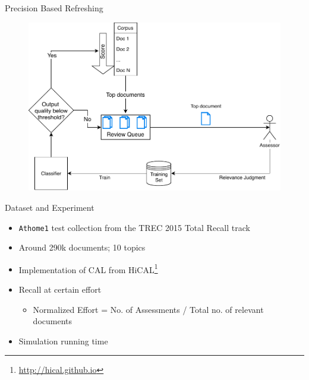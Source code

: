 \documentclass[14pt]{beamer}
\begin{document}
\begin{frame}{Precision Based Refreshing}
\begin{figure}
 \centering 
 \includegraphics[width=1.0\textwidth]{animation/prec.pdf}
\end{figure}
\end{frame}

\begin{frame}{Dataset and Experiment}
    \begin{itemize}
        \item \texttt{Athome1} test collection from the TREC 2015 Total Recall track
        \item Around 290k documents; 10 topics
        \item Implementation of CAL from
            HiCAL\footnote{\url{http://hical.github.io}}
        \item Recall at certain effort
            \begin{itemize}
                \item Normalized Effort = No. of Assessments / Total no. of
                    relevant documents
            \end{itemize}
        \item Simulation running time
    \end{itemize}
\end{frame}
\end{document}
